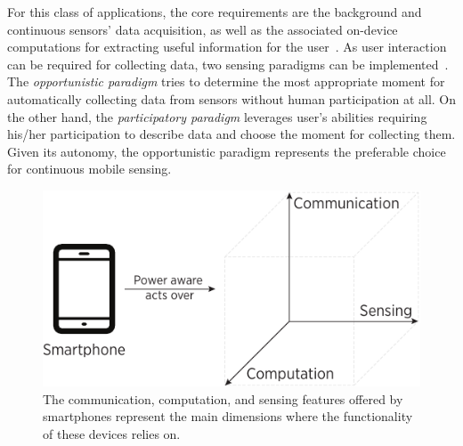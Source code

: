 \documentclass[12pt]{article}
\numberwithin{equation}{section}
\numberwithin{table}{section}
\numberwithin{figure}{section}
\begin{document}
For this class of applications, the core requirements are the background and continuous sensors' data acquisition, as well as the associated on-device computations for extracting useful information for the user~\cite{Lane2010,Ra2012}.
As user interaction can be required for collecting data, two sensing paradigms can be implemented~\cite{Lane2010}.
The \emph{opportunistic paradigm} tries to determine the most appropriate moment for automatically collecting data from sensors without human participation at all.
On the other hand, the \emph{participatory paradigm} leverages user's abilities requiring his/her participation to describe data and choose the moment for collecting them.
Given its autonomy, the opportunistic paradigm represents the preferable choice for continuous mobile sensing.

\begin{figure}[t]
  \centering
  \includegraphics[scale=0.75]{smartphone-dimensions}
  \caption{The communication, computation, and sensing features offered by smartphones represent the main dimensions where the functionality of these devices relies on.}
  \label{fig:smartphone-dimensions}
\end{figure}
\end{document}
